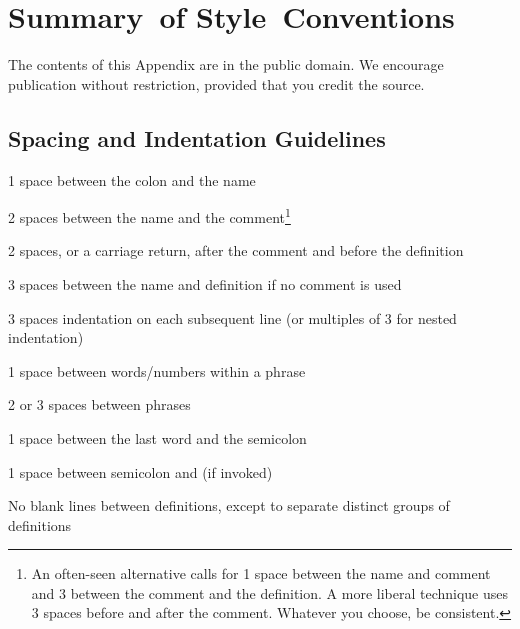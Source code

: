 \chapter{Summary~of
Style~Conventions}
The contents of this Appendix are in the public domain. We encourage
publication without restriction, provided that you credit the source.

\section{Spacing and Indentation Guidelines}
\begin{tfquot}
1 space between the colon and the name

2 spaces between the name and the comment\footnote{
An often-seen alternative calls for 1 space between the name and comment and 3 between
the comment and the definition. A more liberal technique uses 3 spaces before and after the
comment. Whatever you choose, be consistent.
}

2 spaces, or a carriage return, after the comment and before the definition\footnotemark[1]

3 spaces between the name and definition if no comment is used

3 spaces indentation on each subsequent line (or multiples of 3 for nested indentation)

1 space between words/numbers within a phrase

2 or 3 spaces between phrases

1 space between the last word and the semicolon

1 space between semicolon and  (if invoked)
\end{tfquot}
No blank lines between definitions, except to separate distinct groups of
definitions

